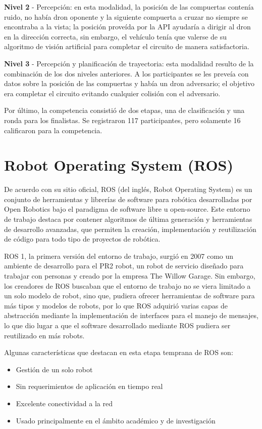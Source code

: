 \textbf{Nivel 2} - Percepción: en esta modalidad, la posición de las compuertas contenía ruido, no había dron oponente y la siguiente compuerta a cruzar no siempre se encontraba a la vista; la posición proveída por la API ayudaría a dirigir al dron en la dirección correcta, sin embargo, el vehículo tenía que valerse de su algoritmo de visión artificial para completar el circuito de manera satisfactoria.

\textbf{Nivel 3} - Percepción y planificación de trayectoria: esta modalidad resulto de la combinación de los dos niveles anteriores. A los participantes se les preveía con datos sobre la posición de las compuertas y había un dron adversario; el objetivo era completar el circuito evitando cualquier colisión con el adversario.

Por último, la competencia consistió de dos etapas, una de clasificación y una ronda para los finalistas. Se registraron 117 participantes, pero solamente 16 calificaron para la competencia.


 
\section{Robot Operating System (ROS)}

De acuerdo con su sitio oficial, ROS (del inglés, Robot Operating System) es un conjunto de herramientas y librerías de software para robótica desarrolladas por Open Robotics bajo el paradigma de software libre u open-source. Este entorno de trabajo destaca por contener algoritmos de última generación y herramientas de desarrollo avanzadas,  que permiten la creación, implementación y reutilización de código para todo tipo de proyectos de robótica.

ROS 1, la primera versión del entorno de trabajo, surgió en 2007 como un ambiente de desarrollo para el PR2 robot, un robot de servicio diseñado para trabajar con personas y creado por la empresa The Willow Garage. Sin embargo, los creadores de ROS buscaban que el entorno de trabajo no se viera limitado a un solo modelo de robot, sino que, pudiera ofrecer herramientas de software para más tipos y modelos de robots, por lo que ROS adquirió varias capas de abstracción mediante la implementación de interfaces para el manejo de mensajes, lo que dio lugar a que el software desarrollado mediante ROS pudiera ser reutilizado en más robots.   

Algunas características que destacan en esta etapa temprana de ROS son:
\begin{itemize}
    \item Gestión de un solo robot
    \item Sin requerimientos de aplicación en tiempo real
    \item Excelente conectividad a la red
    \item Usado principalmente en el ámbito académico y de investigación
\end{itemize}

